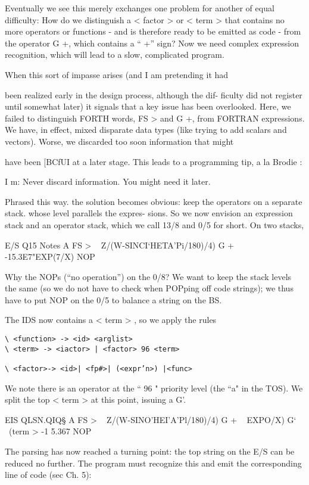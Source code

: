 Eventually we see this merely exchanges one problem for another
of equal difficulty: How do we distinguish a < factor > or
< term > that contains no more operators or functions - and is
therefore ready to be emitted as code - from the operator G +,
which contains a “ +” sign? Now we need complex expression
recognition, which will lead to a slow, complicated program.

When this sort of impasse arises (and I am pretending it had

been realized early in the design process, although the dif-
ficulty did not register until somewhat later) it signals that a key
issue has been overlooked. Here, we failed to distinguish FORTH
words, FS > and G +, from FORTRAN expressions. We have, in
effect, mixed disparate data types (like trying to add scalars and
vectors). Worse, we discarded too soon information that might

have been [BCfUI at a later stage. This leads to a programming tip,
a la Brodie :

I m: Never discard information. You might need it later.

Phrased this way. the solution becomes obvious: keep the
operators on a separate stack. whose level parallels the expres-
sions. So we now envision an expression stack and an operator
stack, which we call 13/8 and 0/5 for short. On two stacks,

E/S Q15 Notes
A FS > \ < subject >
Z/(W-SINCI‘HETA'Pi/180)/4) G + \ < term >
-15.3E7"EXP(7/X) NOP \ < term >

Why the NOPs (“no operation”) on the 0/8? We want to keep
the stack levels the same (so we do not have to check when
POPping off code strings); we thus have to put NOP on the 0/5
to balance a string on the BS.

The IDS now contains a < term > , so we apply the rules
\begin{verbatim}
\ <function> -> <id> <arglist>
\ <term> -> <iactor> | <factor> 96 <term>

\ <factor>-> <id>| <fp#>| (<expr’n>) |<func>
\end{verbatim}

We note there is an operator at the “ 96 " priority level (the “a"
in the TOS). We split the top < term > at this point, issuing a G'.

EIS QLSN.QIQ§
A FS > \ < subject >
Z/(W-SINO’HEI'A'Pl/180)/4) G + \ < term >
EXPO/X) G‘ \ (term >
-1 5.367 NOP


The parsing has now reached a turning point: the top string on
the E/S can be reduced no further. The program must recognize
this and emit the corresponding line of code (sec Ch. 5):

